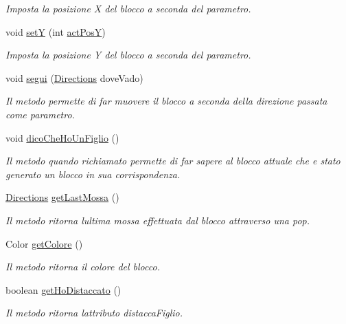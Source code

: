 \begin{DoxyCompactItemize}
\begin{DoxyCompactList}\small\item\em Imposta la posizione X del blocco a seconda del parametro. \end{DoxyCompactList}\item 
void \mbox{\hyperlink{class_snake_1_1game_1_1vipera_1_1blocco_a60e970e880a18799c14e771afe3e904b}{setY}} (int \mbox{\hyperlink{class_snake_1_1game_1_1vipera_1_1blocco_a301b22c6bff25f4530e3f991788338fe}{act\+PosY}})
\begin{DoxyCompactList}\small\item\em Imposta la posizione Y del blocco a seconda del parametro. \end{DoxyCompactList}\item 
void \mbox{\hyperlink{class_snake_1_1game_1_1vipera_1_1blocco_acabc02ee9509cd1e196033348dd76a6f}{segui}} (\mbox{\hyperlink{enum_snake_1_1game_1_1utility_1_1_directions}{Directions}} dove\+Vado)
\begin{DoxyCompactList}\small\item\em Il metodo permette di far muovere il blocco a seconda della direzione passata come parametro. \end{DoxyCompactList}\item 
void \mbox{\hyperlink{class_snake_1_1game_1_1vipera_1_1blocco_a7380314c5c58350a175d844e7121d329}{dico\+Che\+Ho\+Un\+Figlio}} ()
\begin{DoxyCompactList}\small\item\em Il metodo quando richiamato permette di far sapere al blocco attuale che e\textquotesingle{} stato generato un blocco in sua corrispondenza. \end{DoxyCompactList}\item 
\mbox{\hyperlink{enum_snake_1_1game_1_1utility_1_1_directions}{Directions}} \mbox{\hyperlink{class_snake_1_1game_1_1vipera_1_1blocco_a95fdd903a87a54ceaba0674eee0a4dda}{get\+Last\+Mossa}} ()
\begin{DoxyCompactList}\small\item\em Il metodo ritorna l\textquotesingle{}ultima mossa effettuata dal blocco attraverso una pop. \end{DoxyCompactList}\item 
Color \mbox{\hyperlink{class_snake_1_1game_1_1vipera_1_1blocco_ae3f520a7be49ba6d662a1504fbe4acf3}{get\+Colore}} ()
\begin{DoxyCompactList}\small\item\em Il metodo ritorna il colore del blocco. \end{DoxyCompactList}\item 
boolean \mbox{\hyperlink{class_snake_1_1game_1_1vipera_1_1blocco_a09b5923541116b960ee0c349c60b92fe}{get\+Ho\+Distaccato}} ()
\begin{DoxyCompactList}\small\item\em Il metodo ritorna l\textquotesingle{}attributo distacca\+Figlio. \end{DoxyCompactList}\end{DoxyCompactItemize}
